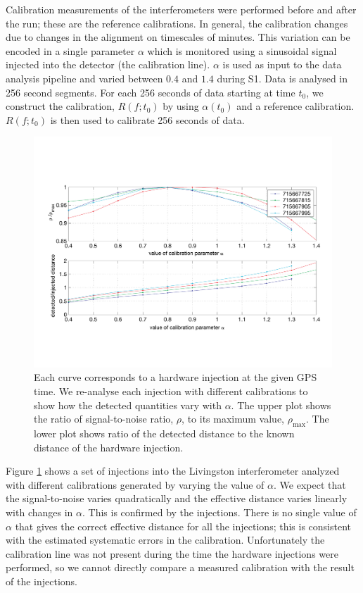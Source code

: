 Calibration measurements of the interferometers were performed before and
after the run; these are the reference calibrations. In general, the
calibration changes due to changes in the alignment on timescales of minutes.
This variation can be encoded in a single parameter $\alpha$ which is
monitored using a sinusoidal signal injected into the
detector (the calibration line)\cite{adhikari2003}. $\alpha$ is used as input
to the data analysis pipeline and varied between $0.4$ and $1.4$ during S1.
Data is analysed in 256 second segments.  For each 256 seconds of data
starting at time $t_0$, we construct the calibration, $R(f;t_0)$ by using
$\alpha(t_0)$ and a reference calibration.  $R(f;t_0)$ is then used to
calibrate 256 seconds of data.

\begin{figure}[htb]
  \vspace{5pt}
  \begin{flushright}
    \includegraphics[width=\textwidth]{calibration}    
  \end{flushright}
  \caption{%
  Each curve corresponds to a hardware injection at the given GPS time. We
  re-analyse each injection with different calibrations to show how the
  detected quantities vary with $\alpha$. The upper plot shows the ratio of
  signal-to-noise ratio, $\rho$, to its maximum value, $\rho_{\mathrm{max}}$.
  The lower plot shows ratio of the detected distance to the known distance of
  the hardware injection.
  }
\label{f:calibration}
\end{figure}
Figure \ref{f:calibration} shows a set of injections into the Livingston
interferometer analyzed with different calibrations generated by varying the
value of $\alpha$. We expect that the signal-to-noise varies quadratically and
the effective distance varies linearly with changes in $\alpha$\cite{bruce}.
This is confirmed by the injections.  There is no single value of $\alpha$
that gives the correct effective distance for all the injections; this is
consistent with the estimated systematic errors in the calibration.
Unfortunately the calibration line was not present during the time the
hardware injections were performed, so we cannot directly compare a measured
calibration with the result of the injections.
